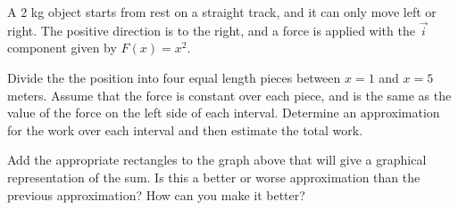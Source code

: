 \begin{problem}
\item A 2 kg object starts from rest on a straight track, and it can
  only move left or right. The positive direction is to the right, and
  a force is applied with the $\vec{i}$ component given by $F(x)=x^2$.




  \begin{subproblem}
    \item Divide the the position into four equal length pieces between $x=1$ and $x=5$ meters.
    Assume that the force is constant over each piece, and is the same as the value of the force on the left side of each interval.
    Determine an approximation for the work over each interval and then estimate the total work.
      \vfill
    \item Add the appropriate rectangles to the graph above that will give a graphical representation of the sum.
    Is this a better or worse approximation than the previous approximation? How can you make it better?
  \end{subproblem}
  \clearpage


\end{problem}
